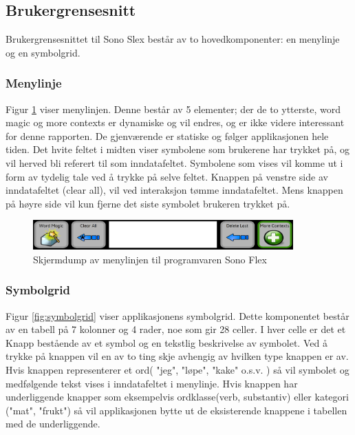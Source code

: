 \documentclass[phd,tocprelim]{cornell}
\begin{document}
\subsection{Brukergrensesnitt}

Brukergrensesnittet til Sono Slex består av to hovedkomponenter: en menylinje og en symbolgrid. 


\subsubsection{Menylinje}

Figur \ref{fig:menylinje} viser menylinjen.  Denne består av 5 elementer; der de to ytterste,  word magic og more contexts er dynamiske og vil endres, og er ikke videre interessant for denne rapporten.  De gjenværende er statiske og følger applikasjonen hele tiden. Det hvite feltet i midten viser symbolene som brukerene har trykket på, og vil herved bli referert til som inndatafeltet. Symbolene som vises vil komme ut i form av tydelig tale ved å trykke på selve feltet. Knappen på venstre side av inndatafeltet (clear all), vil ved interaksjon tømme inndatafeltet. Mens knappen på høyre side vil kun fjerne det siste symbolet brukeren trykket på.


\begin{figure}[ht!]
\centering
\includegraphics[width=100mm]{menylinje}
\caption{Skjermdump av menylinjen til programvaren Sono Flex}
\label{fig:menylinje}
\end{figure}




\subsubsection{Symbolgrid}

Figur \ref{fig:symbolgrid} viser applikasjonens symbolgrid. Dette komponentet består av en tabell på 7 kolonner og 4 rader,  noe som gir 28 celler. I hver celle er det et Knapp bestående av et symbol og en tekstlig beskrivelse av symbolet. Ved å trykke på knappen vil en av to ting skje avhengig av hvilken type knappen er av. Hvis knappen representerer et ord( "jeg",  "løpe",  "kake" o.s.v. ) så vil symbolet og medfølgende tekst vises i inndatafeltet i menylinje.  Hvis knappen har underliggende knapper som eksempelvis ordklasse(verb,  substantiv)  eller kategori ("mat",  "frukt") så vil applikasjonen bytte ut de eksisterende knappene i tabellen med de underliggende. 
\end{document}

